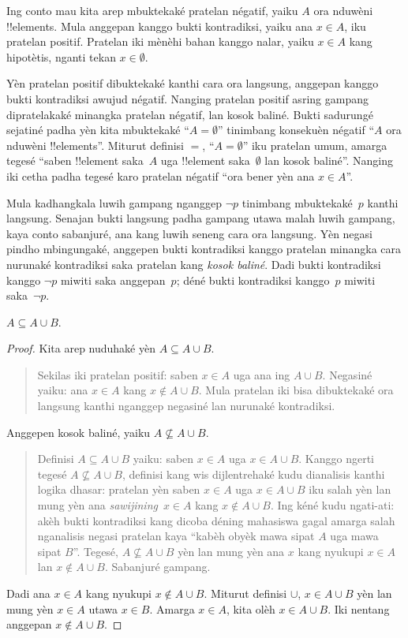 \documentclass[../../../include/open-logic-section]{subfiles}
\begin{document}
Ing conto mau kita arep mbuktekaké pratelan négatif,
yaiku $A$ ora nduwèni !!{element}s. Mula anggepan
kanggo bukti kontradiksi, yaiku ana $x \in A$,
iku pratelan positif. Pratelan iki mènèhi bahan
kanggo nalar, yaiku $x \in A$ kang hipotètis,
nganti tekan $x \in \emptyset$.

Yèn pratelan positif dibuktekaké kanthi cara ora
langsung, anggepan kanggo bukti kontradiksi
awujud négatif. Nanging pratelan positif asring
gampang dipratelakaké minangka pratelan négatif,
lan kosok baliné. Bukti sadurungé sejatiné
padha yèn kita mbuktekaké ``$A = \emptyset$''
tinimbang konsekuèn négatif ``$A$ ora nduwèni
!!{element}s''. Miturut definisi $=$,
``$A = \emptyset$'' iku pratelan umum, amarga
tegesé ``saben !!{element} saka~$A$ uga
!!{element} saka~$\emptyset$ lan kosok baliné''.
Nanging iki cetha padha tegesé karo pratelan
négatif ``ora bener yèn ana $x \in A$''.

Mula kadhangkala luwih gampang nganggep $\lnot p$
tinimbang mbuktekaké~$p$ kanthi langsung.
Senajan bukti langsung padha gampang utawa
malah luwih gampang, kaya conto sabanjuré,
ana kang luwih seneng cara ora langsung.
Yèn negasi pindho mbingungaké, anggepen bukti
kontradiksi kanggo pratelan minangka cara
nurunaké kontradiksi saka pratelan kang
\emph{kosok baliné}. Dadi bukti kontradiksi
kanggo $\lnot p$ miwiti saka anggepan~$p$;
déné bukti kontradiksi kanggo~$p$ miwiti
saka~$\lnot p$.

\begin{prop}
$A \subseteq A \cup B$.
\end{prop}

\begin{proof}
  Kita arep nuduhaké yèn $A \subseteq A \cup B$.
  \begin{quote}
    Sekilas iki pratelan positif: saben $x \in A$
    uga ana ing $A \cup B$. Negasiné yaiku:
    ana $x \in A$ kang $x \notin A \cup B$.
    Mula pratelan iki bisa dibuktekaké ora langsung
    kanthi nganggep negasiné lan nurunaké
    kontradiksi.
  \end{quote}
  Anggepen kosok baliné, yaiku
  $A \nsubseteq A \cup B$.
  \begin{quote}
    Definisi $A \subseteq A \cup B$ yaiku:
    saben $x \in A$ uga $x \in A \cup B$.
    Kanggo ngerti tegesé $A \nsubseteq A \cup B$,
    definisi kang wis dijlentrehaké kudu
    dianalisis kanthi logika dhasar: pratelan
    yèn saben $x \in A$ uga $x \in
    A \cup B$ iku salah yèn lan mung yèn ana
    \emph{sawijining}~$x \in A$ kang
    $x \notin A \cup B$.
    Ing kéné kudu ngati-ati: akèh bukti kontradiksi
    kang dicoba déning mahasiswa gagal amarga
    salah nganalisis negasi pratelan kaya
    ``kabèh obyèk mawa sipat $A$ uga mawa sipat $B$''. Tegesé,
    $A \nsubseteq A \cup B$ yèn lan mung yèn
    ana $x$ kang nyukupi $x \in A$ lan
    $x \notin A \cup B$. Sabanjuré gampang.
  \end{quote}
  Dadi ana $x \in A$ kang nyukupi
  $x \notin A \cup B$. Miturut definisi
  $\cup$, $x \in A \cup B$ yèn lan mung yèn
  $x \in A$ utawa $x \in
  B$. Amarga $x \in A$, kita olèh
  $x \in A \cup B$. Iki nentang anggepan
  $x \notin A \cup B$.
\end{proof}
\end{document}
